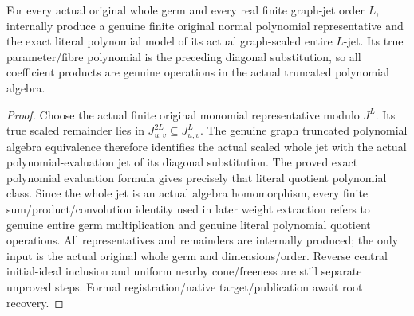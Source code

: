 \begin{theorem}
\label{hir:relative-normal-graph-jets-entire-finite-jet-dictionary}
\leanok
{}
For every actual original whole germ and every real finite graph-jet order $L$, internally produce a genuine finite original normal polynomial representative and the exact literal polynomial model of its actual graph-scaled entire $L$-jet. Its true parameter/fibre polynomial is the preceding diagonal substitution, so all coefficient products are genuine operations in the actual truncated polynomial algebra.
\end{theorem}
\begin{proof}
Choose the actual finite original monomial representative modulo $J^L$. Its true scaled remainder lies in $J_{u,v}^{2L}\subseteq J_{u,v}^{L}$. The genuine graph truncated polynomial algebra equivalence therefore identifies the actual scaled whole jet with the actual polynomial-evaluation jet of its diagonal substitution. The proved exact polynomial evaluation formula gives precisely that literal quotient polynomial class. Since the whole jet is an actual algebra homomorphism, every finite sum/product/convolution identity used in later weight extraction refers to genuine entire germ multiplication and genuine literal polynomial quotient operations. All representatives and remainders are internally produced; the only input is the actual original whole germ and dimensions/order. Reverse central initial-ideal inclusion and uniform nearby cone/freeness are still separate unproved steps. Formal registration/native target/publication await root recovery.
\end{proof}
